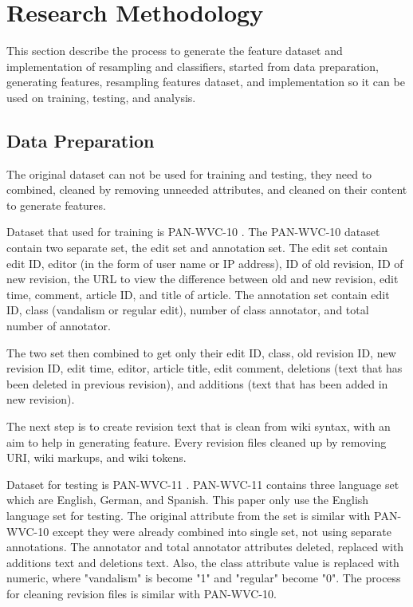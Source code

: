 \documentclass[conference,compsoc,a4paper,twocolumn,final]{IEEEtran}
\begin{document}

\section{Research Methodology}
\label{section:research_methodology}

This section describe the process to generate the feature dataset and
implementation of resampling and classifiers, started from data preparation,
generating features, resampling features dataset, and implementation so it can
be used on training, testing, and analysis.

\subsection{Data Preparation}
\label{subsection:data_preparation}

The original dataset can not be used for training and testing, they need to
combined, cleaned by removing unneeded attributes, and cleaned on their content
to generate features.

Dataset that used for training is PAN-WVC-10 \cite{potthast2008automatic}.
The PAN-WVC-10 dataset contain two separate set, the edit set and
annotation set.
The edit set contain edit ID, editor (in the form of user name or IP address),
ID of old revision, ID of new revision, the URL to view the difference between
old and new revision, edit time, comment, article ID, and title of article.
The annotation set contain edit ID, class (vandalism or regular edit), number
of class annotator, and total number of annotator.

The two set then combined to get only their edit ID, class, old revision ID,
new revision ID, edit time, editor, article title, edit comment, deletions
(text that has been deleted in previous revision), and additions (text that
has been added in new revision).

The next step is to create revision text that is clean from wiki syntax, with
an aim to help in generating feature.
Every revision files cleaned up by removing URI, wiki markups, and wiki tokens.

Dataset for testing is PAN-WVC-11 \cite{potthast:2010b}.
PAN-WVC-11 contains three language set which are English, German, and Spanish.
This paper only use the English language set for testing.
The original attribute from the set is similar with PAN-WVC-10 except they were
already combined into single set, not using separate annotations.
The annotator and total annotator attributes deleted, replaced with
additions text and deletions text.
Also, the class attribute value is replaced with numeric, where
"vandalism" is become "1" and "regular" become "0".
The process for cleaning revision files is similar with PAN-WVC-10.
\end{document}
